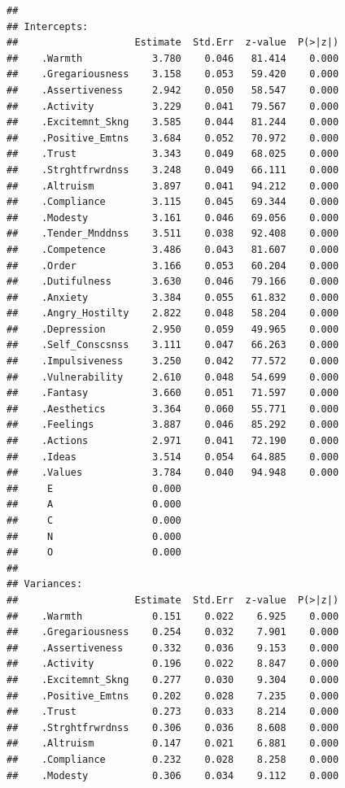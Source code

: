 \documentclass{article}\usepackage[]{graphicx}\usepackage[]{color}
\makeatletter
\newenvironment{kframe}{%
 \def\at@end@of@kframe{}%
 \ifinner\ifhmode%
  \def\at@end@of@kframe{\end{minipage}}%
  \begin{minipage}{\columnwidth}%
 \fi\fi%
 \def\FrameCommand##1{\hskip\@totalleftmargin \hskip-\fboxsep
 \colorbox{shadecolor}{##1}\hskip-\fboxsep
     \hskip-\linewidth \hskip-\@totalleftmargin \hskip\columnwidth}%
 \MakeFramed {\advance\hsize-\width
   \@totalleftmargin\z@ \linewidth\hsize
   \@setminipage}}%
 {\par\unskip\endMakeFramed%
 \at@end@of@kframe}
\newenvironment{knitrout}{}{} %
\makeatother
\begin{document}
\begin{knitrout}
\begin{kframe}
\begin{verbatim}
## 
## Intercepts:
##                    Estimate  Std.Err  z-value  P(>|z|)
##    .Warmth            3.780    0.046   81.414    0.000
##    .Gregariousness    3.158    0.053   59.420    0.000
##    .Assertiveness     2.942    0.050   58.547    0.000
##    .Activity          3.229    0.041   79.567    0.000
##    .Excitemnt_Skng    3.585    0.044   81.244    0.000
##    .Positive_Emtns    3.684    0.052   70.972    0.000
##    .Trust             3.343    0.049   68.025    0.000
##    .Strghtfrwrdnss    3.248    0.049   66.111    0.000
##    .Altruism          3.897    0.041   94.212    0.000
##    .Compliance        3.115    0.045   69.344    0.000
##    .Modesty           3.161    0.046   69.056    0.000
##    .Tender_Mnddnss    3.511    0.038   92.408    0.000
##    .Competence        3.486    0.043   81.607    0.000
##    .Order             3.166    0.053   60.204    0.000
##    .Dutifulness       3.630    0.046   79.166    0.000
##    .Anxiety           3.384    0.055   61.832    0.000
##    .Angry_Hostilty    2.822    0.048   58.204    0.000
##    .Depression        2.950    0.059   49.965    0.000
##    .Self_Conscsnss    3.111    0.047   66.263    0.000
##    .Impulsiveness     3.250    0.042   77.572    0.000
##    .Vulnerability     2.610    0.048   54.699    0.000
##    .Fantasy           3.660    0.051   71.597    0.000
##    .Aesthetics        3.364    0.060   55.771    0.000
##    .Feelings          3.887    0.046   85.292    0.000
##    .Actions           2.971    0.041   72.190    0.000
##    .Ideas             3.514    0.054   64.885    0.000
##    .Values            3.784    0.040   94.948    0.000
##     E                 0.000                           
##     A                 0.000                           
##     C                 0.000                           
##     N                 0.000                           
##     O                 0.000                           
## 
## Variances:
##                    Estimate  Std.Err  z-value  P(>|z|)
##    .Warmth            0.151    0.022    6.925    0.000
##    .Gregariousness    0.254    0.032    7.901    0.000
##    .Assertiveness     0.332    0.036    9.153    0.000
##    .Activity          0.196    0.022    8.847    0.000
##    .Excitemnt_Skng    0.277    0.030    9.304    0.000
##    .Positive_Emtns    0.202    0.028    7.235    0.000
##    .Trust             0.273    0.033    8.214    0.000
##    .Strghtfrwrdnss    0.306    0.036    8.608    0.000
##    .Altruism          0.147    0.021    6.881    0.000
##    .Compliance        0.232    0.028    8.258    0.000
##    .Modesty           0.306    0.034    9.112    0.000

\end{verbatim}
\end{kframe}
\end{knitrout}
\end{document}
